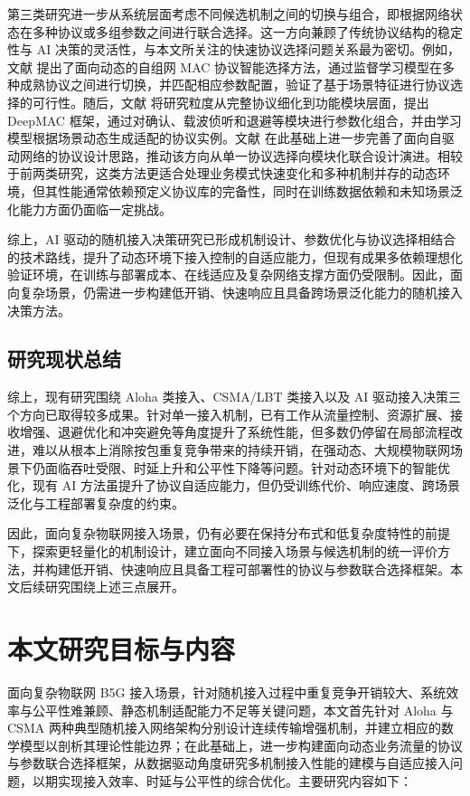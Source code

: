 第三类研究进一步从系统层面考虑不同候选机制之间的切换与组合，即根据网络状态在多种协议或多组参数之间进行联合选择。这一方向兼顾了传统协议结构的稳定性与 AI 决策的灵活性，与本文所关注的快速协议选择问题关系最为密切。例如，文献\cite{2019_ICCT_Selection} 提出了面向动态的自组网 MAC 协议智能选择方法，通过监督学习模型在多种成熟协议之间进行切换，并匹配相应参数配置，验证了基于场景特征进行协议选择的可行性。随后，文献\cite{2020_ICAIIC_MACDesign} 将研究粒度从完整协议细化到功能模块层面，提出 DeepMAC 框架，通过对确认、载波侦听和退避等模块进行参数化组合，并由学习模型根据场景动态生成适配的协议实例。文献\cite{2021_ACCESS_SelfDriving} 在此基础上进一步完善了面向自驱动网络的协议设计思路，推动该方向从单一协议选择向模块化联合设计演进。相较于前两类研究，这类方法更适合处理业务模式快速变化和多种机制并存的动态环境，但其性能通常依赖预定义协议库的完备性，同时在训练数据依赖和未知场景泛化能力方面仍面临一定挑战。

综上，AI 驱动的随机接入决策研究已形成机制设计、参数优化与协议选择相结合的技术路线，提升了动态环境下接入控制的自适应能力，但现有成果多依赖理想化验证环境，在训练与部署成本、在线适应及复杂网络支撑方面仍受限制。因此，面向复杂场景，仍需进一步构建低开销、快速响应且具备跨场景泛化能力的随机接入决策方法。

\subsection{研究现状总结}

综上，现有研究围绕 Aloha 类接入、CSMA/LBT 类接入以及 AI 驱动接入决策三个方向已取得较多成果。针对单一接入机制，已有工作从流量控制、资源扩展、接收增强、退避优化和冲突避免等角度提升了系统性能，但多数仍停留在局部流程改进，难以从根本上消除按包重复竞争带来的持续开销，在强动态、大规模物联网场景下仍面临吞吐受限、时延上升和公平性下降等问题。针对动态环境下的智能优化，现有 AI 方法虽提升了协议自适应能力，但仍受训练代价、响应速度、跨场景泛化与工程部署复杂度的约束。

因此，面向复杂物联网接入场景，仍有必要在保持分布式和低复杂度特性的前提下，探索更轻量化的机制设计，建立面向不同接入场景与候选机制的统一评价方法，并构建低开销、快速响应且具备工程可部署性的协议与参数联合选择框架。本文后续研究围绕上述三点展开。


\section{本文研究目标与内容}
\label{sec:work_overview}

面向复杂物联网 B5G 接入场景，针对随机接入过程中重复竞争开销较大、系统效率与公平性难兼顾、静态机制适配能力不足等关键问题，本文首先针对 Aloha 与 CSMA 两种典型随机接入网络架构分别设计连续传输增强机制，并建立相应的数学模型以剖析其理论性能边界；在此基础上，进一步构建面向动态业务流量的协议与参数联合选择框架，从数据驱动角度研究多机制接入性能的建模与自适应接入问题，以期实现接入效率、时延与公平性的综合优化。主要研究内容如下：

